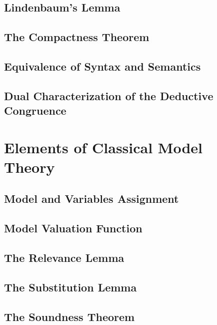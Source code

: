 \documentclass{report}
\begin{document}
    \subsection{Lindenbaum's Lemma}
      
    \subsection{The Compactness Theorem}
      
    \subsection{Equivalence of Syntax and Semantics}
      
    \subsection{Dual Characterization of the Deductive Congruence}
      
\section{Elements of Classical Model Theory}
    \subsection{Model and Variables Assignment}
      
    \subsection{Model Valuation Function}
      
    \subsection{The Relevance Lemma}
      
    \subsection{The Substitution Lemma}
      
    \subsection{The Soundness Theorem}
      
\end{document}
